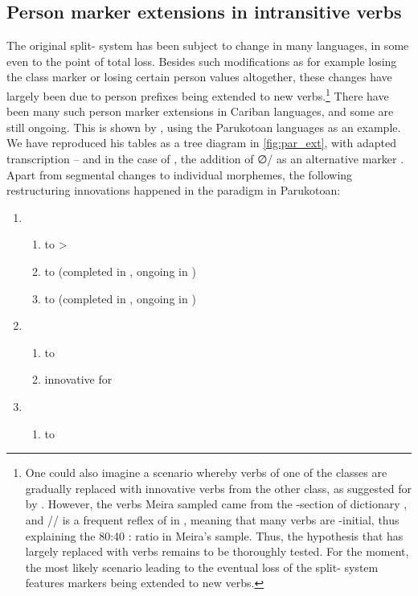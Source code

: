 \subsection{Person marker extensions in intransitive verbs}
\label{sec:extensions_intro}
The original \PC split- system has been subject to change in many languages, in some even to the point of total loss.
Besides such modifications as for example losing the  class marker   or losing certain person values altogether, these changes have largely been due to person prefixes being extended to new verbs.\footnote{
One could also imagine a scenario whereby verbs of one of the classes are gradually replaced with innovative verbs from the other class, as suggested for \panare by \textcite[225]{meira2000split}.
However, the verbs Meira sampled came from the -section of  dictionary , and \slash{}\slash{} is a frequent reflex of \detrz in \panare, meaning that many  verbs are -initial, thus explaining the 80:40 : ratio in Meira's sample.
Thus, the hypothesis that \panare has largely replaced  with  verbs remains to be thoroughly tested.
For the moment, the most likely scenario leading to the eventual loss of the split- system features markers being extended to new verbs.}
There have been many such person marker extensions in Cariban languages, and some are still ongoing.
This is shown by \textcite{gildea1998}, using the Parukotoan languages as an example.
We have reproduced his tables as a tree diagram in \cref{fig:par_ext}, with adapted transcription -- and in the case of \kaxui, the addition of ∅/ as an alternative  marker .
Apart from segmental changes to individual morphemes, the following restructuring innovations happened in the \setone paradigm in Parukotoan:

\begin{enumerate}
\item \PPar \begin{enumerate}
	\item {}  to >
	\item {}  to  (completed in \PWai, ongoing in \kaxui)
	\item {}  to  (completed in \PWai, ongoing in \kaxui)
\end{enumerate}
\item \PWai \begin{enumerate}
\item {}  to 
\item innovative   for 
\end{enumerate}
\item \waiwai \begin{enumerate}
\item {}  to \end{enumerate}
\end{enumerate}

